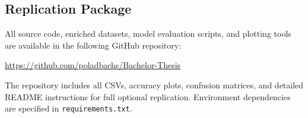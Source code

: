 \documentclass[a4paper]{usiinfbachelorproject}
\begin{document}
\subsection*{Replication Package}\label{sec:replication}
All source code, enriched datasets, model evaluation scripts, and plotting tools are available in the following GitHub repository:
\begin{center}
\url{https://github.com/poladbachs/Bachelor-Thesis}
\end{center}
The repository includes all CSVs, accuracy plots, confusion matrices, and detailed README instructions for full optional replication. Environment dependencies are specified in \texttt{requirements.txt}.

\clearpage



\end{document}
